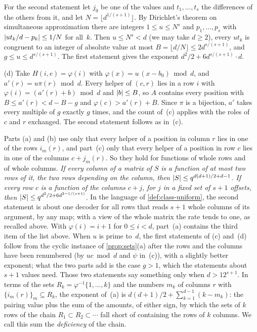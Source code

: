 \begin{informalproof}
For the second statement let $j_0$ be one of the values and $t_1,\dots,t_s$ the differences of the others from it,
and let $N=\lfloor d^{1/(s+1)}\rfloor$. By Dirichlet's theorem on simultaneous approximation there are integers
$1\le u\le N^s$ and $p_1,\dots,p_s$ with $\lvert ut_k/d-p_k \rvert\le1/N$ for all~$k$. Then $u\le N^s<d$ (we may take
$d\ge2$), every $ut_k$ is
congruent to an integer of absolute value at most $B=\lfloor d/N\rfloor\le2d^{s/(s+1)}$, and
$g\le u\le d^{s/(s+1)}$. The first statement gives the exponent $d^2/2+6d^{s/(s+1)}\cdot d$.

(d) Take $H(i,e)=\varphi(i)$ with $\varphi(x)=u\,(x-b_0)\bmod d$, and $a'(r)=u\pi(r)\bmod d$. Every helper of
$(c,r)$ lies in a row $i$ with $\varphi(i)=(a'(r)+b)\bmod d$ and $\lvert b \rvert\le B$, so $A$ contains every position with
$B\le a'(r)<d-B-g$ and $\varphi(c)>a'(r)+B$. Since $\pi$ is a bijection, $a'$ takes every multiple of $g$ exactly
$g$ times, and the count of~(c) applies with the roles of $c$ and $r$ exchanged. The second statement follows as
in~(c).
\end{informalproof}

Parts (a) and (b) use only that every helper of a position in column $r$ lies in one of the rows $i_m(r)$, and
part~(c) only that every helper of a position in row $c$ lies in one of the columns $c+j_m(r)$. So they hold for
functions of whole rows and of whole columns. \emph{If every column of a matrix of $S$ is a function of at most two
rows of it, the two rows depending on the column, then $\lvert S \rvert\le q^{d(d+1)/2+d-1}$. If every row $c$ is a function
of the columns $c+j$, for $j$ in a fixed set of $s+1$ offsets, then $\lvert S \rvert\le q^{d^2/2+6d^{2-1/(s+1)}}$.} In the
language of \cref{def:class-uniform}, the second statement is about one decoder for all rows that reads $s+1$ whole
columns of its argument, by any map; with a view of the whole matrix the rate tends to one, as recalled above. With
$\varphi(i)=i+1$ for $0\le i<d$, part~(a) contains the third item of the list above. When $u$ is prime to~$d$,
the first statements of (c) and~(d) follow from the cyclic instance of \cref{prop:sets}(a) after the rows and the
columns have been renumbered (by $uc \bmod d$ and $\psi$ in~(c)), with a slightly better exponent; what the two
parts add is the case $g>1$, which the statements about $s+1$ values need. Those two
statements say something only when $d>12^{s+1}$. In terms of the sets $R_k=\varphi^{-1}\{1,\dots,k\}$ and the
numbers $m_k$ of columns $r$ with $\{i_m(r)\}_m\subseteq R_k$, the exponent of~(a) is
$d(d+1)/2+\sum_{k=1}^{d-1}(k-m_k)$: the pairing value plus the sum of the amounts, of either sign, by which the
sets of $k$ rows of the chain $R_1\subset R_2\subset\cdots$ fall short of containing the rows of $k$ columns. We
call this sum the \emph{deficiency} of the chain.

